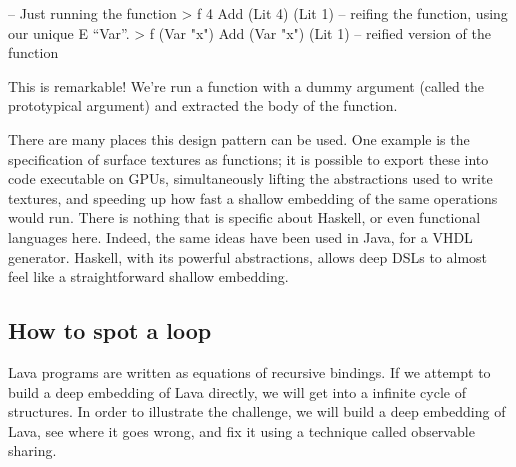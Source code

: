 \documentclass[11pt]{article}
\begin{document}
\begin{Code}
-- Just running the function
> f 4
Add (Lit 4) (Lit 1)
-- reifing the function, using our unique E ``Var''.
> f (Var "x")
Add (Var "x") (Lit 1)   -- reified version of the function
\end{Code}

This is remarkable! We're run a function with 
a dummy argument (called the prototypical argument)
and extracted the body of the function.

There are many places this design pattern can be used. One example is the specification
of surface textures as functions; it is possible to export these into code executable
on GPUs, simultaneously lifting the abstractions used to write textures, and speeding
up how fast a shallow embedding of the same operations would run.  There is nothing
that is specific about Haskell, or even functional languages here. Indeed, the same
ideas have been used in Java, for a VHDL generator. Haskell, with its powerful abstractions,
allows deep DSLs to almost feel like a straightforward shallow embedding.

\subsection{How to spot a loop}

Lava programs are written as equations of recursive bindings.
If we attempt to build a deep embedding of Lava directly,
we will get into a infinite cycle of structures. In order to illustrate
the challenge, we will build a deep embedding of Lava,
see where it goes wrong, and fix it using a technique called
observable sharing.
\end{document}
